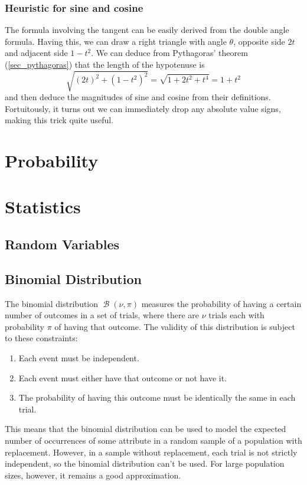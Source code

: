 \documentclass[fleqn,a4paper,11pt]{article}
\DeclareMathOperator{\Binomial}{\mathcal{B}}
\begin{document}
    \subsubsection{Heuristic for sine and cosine}


    The formula involving the tangent can be easily derived from the double
    angle formula. Having this, we can draw a right triangle with angle
    \(\theta\), opposite side \(2t\) and adjacent side \(1 - t^2\). We can
    deduce from Pythagoras' theorem (\ref{sec_pythagoras}) that the length of
    the hypotenuse is
    \begin{equation*}
    \sqrt{(2t)^2 + (1 - t^2)^2} = \sqrt{1 + 2t^2 + t^4} = 1 + t^2
    \end{equation*}
    and then deduce the magnitudes of sine and cosine from their definitions.
    Fortuitously, it turns out we can immediately drop any absolute value
    signs, making this trick quite useful.

    \section{Probability}

    \section{Statistics}

    \subsection{Random Variables}

    \subsection{Binomial Distribution}


    The binomial distribution \(\Binomial(\nu, \pi)\) measures the probability
    of having a certain number of outcomes in a set of trials,  where there are
    \(\nu\) trials each with probability \(\pi\) of having that outcome.
    The validity of this distribution is subject to these constraints:
    \begin{enumerate}
    \item Each event must be independent.
    \item Each event must either have that outcome or not have it.
    \item The probability of having this outcome must be identically the same in
          each trial.
    \end{enumerate}
    This means that the binomial distribution can be used to model the expected
    number of occurrences of some attribute in a random sample of a population
    with replacement. However, in a sample without replacement, each trial is
    not strictly independent, so the binomial distribution can't be used. For
    large population sizes, however, it remains a good approximation.
\end{document}
